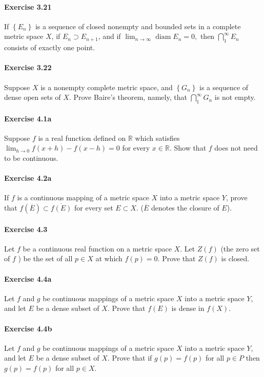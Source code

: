 \documentclass{article}
\begin{document}
\paragraph{Exercise 3.21} If $\left\{E_{n}\right\}$ is a sequence of closed nonempty and bounded sets in a complete metric space $X$, if $E_{n} \supset E_{n+1}$, and if $\lim _{n \rightarrow \infty} \operatorname{diam} E_{n}=0,$ then $\bigcap_{1}^{\infty} E_{n}$ consists of exactly one point.

\paragraph{Exercise 3.22} Suppose $X$ is a nonempty complete metric space, and $\left\{G_{n}\right\}$ is a sequence of dense open sets of $X$. Prove Baire's theorem, namely, that $\bigcap_{1}^{\infty} G_{n}$ is not empty.

\paragraph{Exercise 4.1a} Suppose $f$ is a real function defined on $\mathbb{R}$ which satisfies $\lim_{h \rightarrow 0} f(x + h) - f(x - h) = 0$ for every $x \in \mathbb{R}$. Show that $f$ does not need to be continuous.

\paragraph{Exercise 4.2a} If $f$ is a continuous mapping of a metric space $X$ into a metric space $Y$, prove that $f(\overline{E}) \subset \overline{f(E)}$ for every set $E \subset X$. ($\overline{E}$ denotes the closure of $E$).

\paragraph{Exercise 4.3} Let $f$ be a continuous real function on a metric space $X$. Let $Z(f)$ (the zero set of $f$ ) be the set of all $p \in X$ at which $f(p)=0$. Prove that $Z(f)$ is closed.

\paragraph{Exercise 4.4a} Let $f$ and $g$ be continuous mappings of a metric space $X$ into a metric space $Y$, and let $E$ be a dense subset of $X$. Prove that $f(E)$ is dense in $f(X)$.

\paragraph{Exercise 4.4b} Let $f$ and $g$ be continuous mappings of a metric space $X$ into a metric space $Y$, and let $E$ be a dense subset of $X$. Prove that if $g(p) = f(p)$ for all $p \in P$ then $g(p) = f(p)$ for all $p \in X$.
\end{document}
